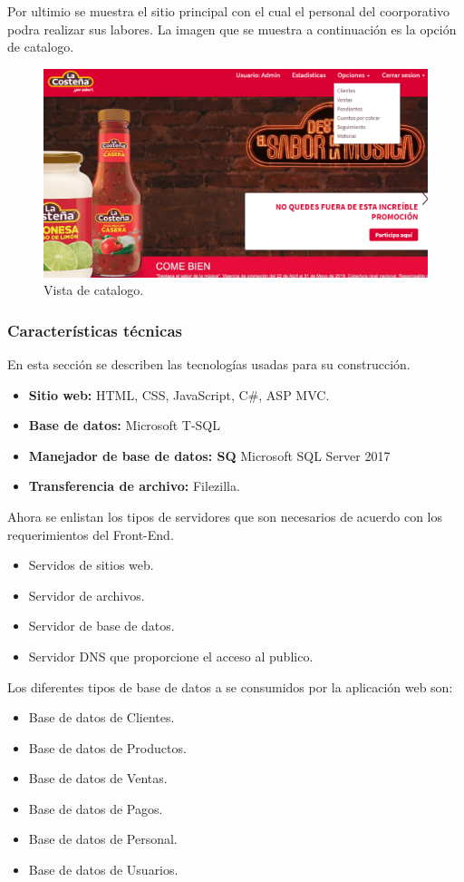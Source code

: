 \documentclass[12pt,letterpaper]{article}
\begin{document}
\newpage
Por ultimio se muestra el sitio principal con el cual el personal del coorporativo podra 
realizar sus labores. 
La imagen que se muestra a continuación es la opción de catalogo.
\begin{figure}[ht]
    \centering
    \includegraphics[width=1\textwidth]{imagenes/fron2.png}
    \caption{Vista de catalogo.}
\end{figure}

\subsubsection{Características técnicas}
En esta sección se describen las tecnologías usadas para su construcción.
\begin{itemize}
    \item \textbf{Sitio web:} HTML, CSS, JavaScript, C\#, ASP MVC.
    \item \textbf{Base de datos: } Microsoft T-SQL
    \item \textbf{Manejador de base de datos: SQ} Microsoft SQL Server 2017
    \item \textbf{Transferencia de archivo: } Filezilla.
\end{itemize}
Ahora se enlistan los tipos de servidores que son necesarios de acuerdo con los 
requerimientos del Front-End.
\begin{itemize}
    \item Servidos de sitios web.
    \item Servidor de archivos.
    \item Servidor de base de datos.
    \item Servidor DNS que proporcione el acceso al publico.
\end{itemize}
Los diferentes tipos de base de datos a se consumidos por la aplicación web son:
\begin{itemize}
    \item Base de datos de Clientes.
    \item Base de datos de Productos.
    \item Base de datos de Ventas.
    \item Base de datos de Pagos.
    \item Base de datos de Personal.
    \item Base de datos de Usuarios.
\end{itemize}
\end{document}
